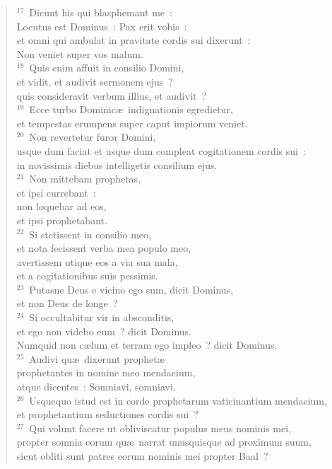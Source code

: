 \begin{verse}
${}^{17}$~Dicunt his qui blasphemant me~:\\ Locutus est Dominus~: Pax erit vobis~:\\ et omni qui ambulat in pravitate cordis sui dixerunt~:\\ Non veniet super vos malum.\\
${}^{18}$~Quis enim affuit in consilio Domini,\\ et vidit, et audivit sermonem ejus~?\\ quis consideravit verbum illius, et audivit~?\\
${}^{19}$~Ecce turbo Dominic\ae\ indignationis egredietur,\\ et tempestas erumpens super caput impiorum veniet.\\
${}^{20}$~Non revertetur furor Domini,\\ usque dum faciat et usque dum compleat cogitationem cordis sui~:\\ in novissimis diebus intelligetis consilium ejus.\\
${}^{21}$~Non mittebam prophetas,\\ et ipsi currebant~:\\ non loquebar ad eos,\\ et ipsi prophetabant.\\
${}^{22}$~Si stetissent in consilio meo,\\ et nota fecissent verba mea populo meo,\\ avertissem utique eos a via sua mala,\\ et a cogitationibus suis pessimis.\\
${}^{23}$~Putasne Deus e vicino ego sum, dicit Dominus,\\ et non Deus de longe~?\\
${}^{24}$~Si occultabitur vir in absconditis,\\ et ego non videbo eum~? dicit Dominus.\\ Numquid non c\ae lum et terram ego impleo~? dicit Dominus.\\
${}^{25}$~Audivi qu\ae\ dixerunt prophet\ae \\ prophetantes in nomine meo mendacium,\\ atque dicentes~: Somniavi, somniavi.\\
${}^{26}$~Usquequo istud est in corde prophetarum vaticinantium mendacium,\\ et prophetantium seductiones cordis sui~?\\
${}^{27}$~Qui volunt facere ut obliviscatur populus meus nominis mei,\\ propter somnia eorum qu\ae\ narrat unusquisque ad proximum suum,\\ sicut obliti sunt patres eorum nominis mei propter Baal~?\\

\end{verse}
